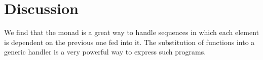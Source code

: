 \section{Discussion}
We find that the monad is a great way to handle sequences in which each
element is dependent on the previous one fed into it. The substitution of
functions into a generic handler is a very powerful way to express such
programs.
